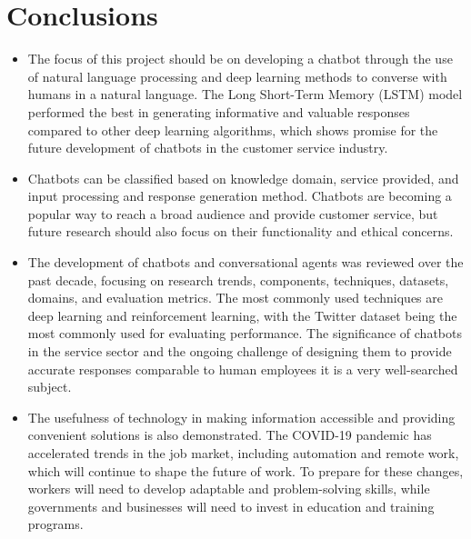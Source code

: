 \documentclass[12pt, twoside]{article}
\begin{document}
\section{Conclusions}
\begin{itemize}
	\item The focus of this project should be on developing a chatbot through the use of natural language processing and deep learning methods to converse with humans in a natural language. The Long Short-Term Memory (LSTM) model performed the best in generating informative and valuable responses compared to other deep learning algorithms, which shows promise for the future development of chatbots in the customer service industry.
	
	\item Chatbots can be classified based on knowledge domain, service provided, and input processing and response generation method. Chatbots are becoming a popular way to reach a broad audience and provide customer service, but future research should also focus on their functionality and ethical concerns.
	
	\item The development of chatbots and conversational agents was reviewed over the past decade, focusing on research trends, components, techniques, datasets, domains, and evaluation metrics. The most commonly used techniques are deep learning and reinforcement learning, with the Twitter dataset being the most commonly used for evaluating performance. The significance of chatbots in the service sector and the ongoing challenge of designing them to provide accurate responses comparable to human employees it is a very well-searched subject.
	
	\item The usefulness of technology in making information accessible and providing convenient solutions is also demonstrated. The COVID-19 pandemic has accelerated trends in the job market, including automation and remote work, which will continue to shape the future of work. To prepare for these changes, workers will need to develop adaptable and problem-solving skills, while governments and businesses will need to invest in education and training programs.

\end{itemize}
\end{document}
